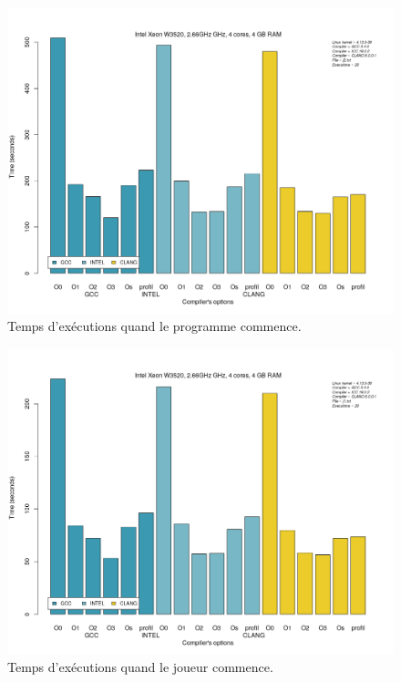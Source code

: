 \documentclass[
 aip,
 jmp,
 amsmath,amssymb,
 reprint
]{revtex4-1}
\begin{document}
\begin{figure}[H]
  \includegraphics[width=\linewidth, keepaspectratio=true]{GCCvsICCvsCLANG_j2.png}
  \caption{Temps d'exécutions quand le programme commence.\label{Fig:temps_exec_j2}}
  \end{figure}
\begin{figure}[H]
  \includegraphics[width=\linewidth, keepaspectratio=true]{GCCvsICCvsCLANG_j1.png}
  \caption{Temps d'exécutions quand le joueur commence.\label{Fig:temps_exec_j1}}
\end{figure}
\end{document}
